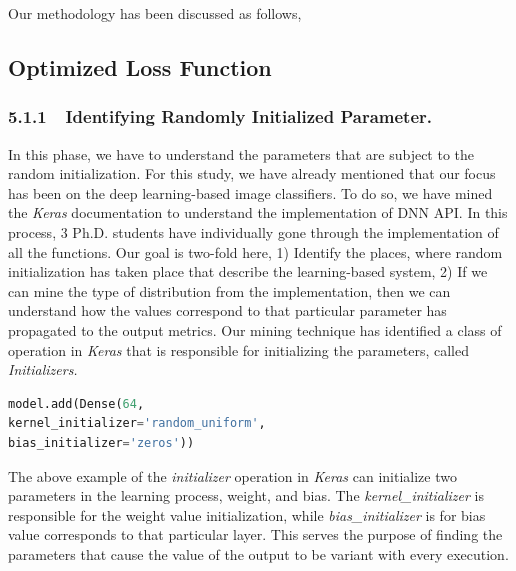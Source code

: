 Our methodology has been discussed as follows,
\subsection{Optimized Loss Function}
\subsubsection{5.1.1~~Identifying Randomly Initialized Parameter.}
In this phase, we have to understand the parameters that are subject to the random initialization. For this study, we have already mentioned that our focus has been on the deep learning-based image classifiers. To do so, we have mined the \emph{Keras} documentation to understand the implementation of DNN API. In this process, 3 Ph.D. students have individually gone through the implementation of all the functions. Our goal is two-fold here, 1) Identify the places, where random initialization has taken place that describe the learning-based system, 2) If we can mine the type of distribution from the implementation, then we can understand how the values correspond to that particular parameter has propagated to the output metrics. Our mining technique has identified a class of operation in \emph{Keras} that is responsible for initializing the parameters, called \emph{Initializers.} 
\begin{lstlisting}[language=Python, caption=Example of initialization parameters in Keras]
model.add(Dense(64,
kernel_initializer='random_uniform',
bias_initializer='zeros'))
\end{lstlisting}
The above example of the \emph{initializer} operation in \emph{Keras} can initialize two parameters in the learning process, weight, and bias. The \emph{kernel\_initializer} is responsible for the weight value initialization, while \emph{bias\_initializer} is for bias value corresponds to that particular layer. This serves the purpose of finding the parameters that cause the value of the output to be variant with every execution. 

